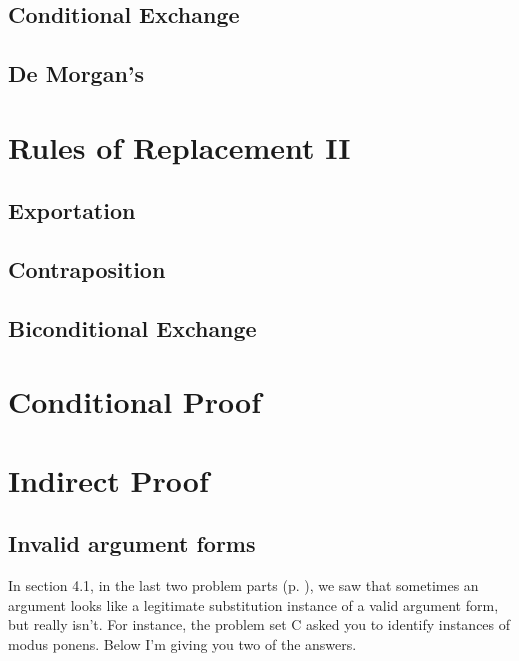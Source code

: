 \subsection{Conditional Exchange}

\subsection{De Morgan's}

\section{Rules of Replacement II}

\subsection{Exportation}

\subsection{Contraposition}

\subsection{Biconditional Exchange}

\section{Conditional Proof}

\section{Indirect Proof}

\subsection{Invalid argument forms}


In section 4.1, in the last two problem parts  (p. \pageref{sec4.1partC}), we saw that sometimes an argument looks like a legitimate substitution instance of a valid argument form, but really isn't.  For instance, the problem set C asked you to identify instances of modus ponens. Below I'm giving you two of the answers.
 
